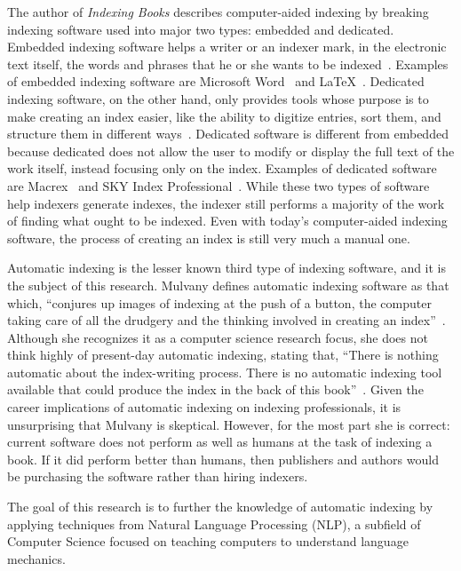 The author of {\it Indexing Books} describes computer-aided indexing by breaking indexing software used into major two types: embedded and dedicated.
Embedded indexing software helps a writer or an indexer mark, in the electronic text itself, the words and phrases that he or she wants to be indexed~\cite{mulvany}.
Examples of embedded indexing software are Microsoft Word~\cite{ms-word-indexing} and \LaTeX~\cite{lamport}.
Dedicated indexing software, on the other hand, only provides tools whose purpose is to make creating an index easier, like the ability to digitize entries, sort them, and structure them in different ways~\cite{mulvany}.
Dedicated software is different from embedded because dedicated does not allow the user to modify or display the full text of the work itself, instead focusing only on the index.
Examples of dedicated software are Macrex~\cite{macrex} and SKY Index Professional~\cite{sky-software}.
While these two types of software help indexers generate indexes, the indexer still performs a majority of the work of finding what ought to be indexed.
Even with today's computer-aided indexing software, the process of creating an index is still very much a manual one.

Automatic indexing is the lesser known third type of indexing software, and it is the subject of this research.
Mulvany defines automatic indexing software as that which, ``conjures up images of indexing at the push of a button, the computer taking care of all the drudgery and the thinking involved in creating an index''~\cite{mulvany}.
Although she recognizes it as a computer science research focus, she does not think highly of present-day automatic indexing, stating that, ``There is nothing automatic about the index-writing process.
There is no automatic indexing tool available that could produce the index in the back of this book''~\cite{mulvany}.
Given the career implications of automatic indexing on indexing professionals, it is unsurprising that Mulvany is skeptical.
However, for the most part she is correct: current software does not perform as well as humans at the task of indexing a book.
If it did perform better than humans, then publishers and authors would be purchasing the software rather than hiring indexers.

The goal of this research is to further the knowledge of automatic indexing by applying techniques from Natural Language Processing (NLP), a subfield of Computer Science focused on teaching computers to understand language mechanics.
